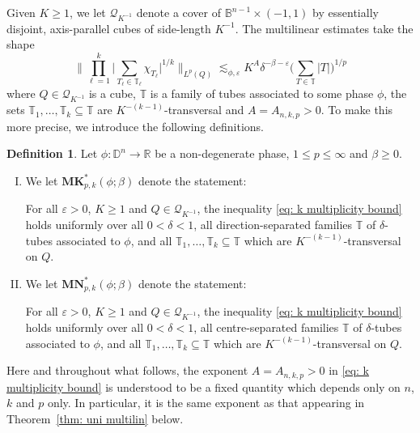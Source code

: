 \documentclass[reqno]{amsart}
\numberwithin{equation}{section}
\newcommand{\B}{\mathbb{B}}
\newcommand{\D}{\mathbb{D}}
\newcommand{\R}{\mathbb{R}}
\newcommand{\T}{\mathbb{T}}
\newcommand{\cQ}{\mathcal{Q}}
\newcommand{\bK}{\mathbf{K}}
\newcommand{\bM}{\mathbf{M}}
\theoremstyle{plain}
\theoremstyle{definition}
\newtheorem{definition}[theorem]{Definition}
\begin{document}
Given $K \geq 1$, we let $\cQ_{K^{-1}}$ denote a cover of $\B^{n-1} \times (-1,1)$ by essentially disjoint, axis-parallel cubes of side-length $K^{-1}$. The multilinear estimates take the shape
\begin{equation}\label{eq: k multiplicity bound}
     \Big\| \prod_{\ell = 1}^k \big|\sum_{T_{\ell} \in \T_{\ell}} \chi_{T_{\ell}}\big|^{1/k}\Big\|_{L^p(Q)} \lesssim_{\phi, \varepsilon} K^A \delta^{-\beta - \varepsilon} \Big(\sum_{T \in \T} |T| \Big)^{1/p}
    \end{equation}
where $Q \in \cQ_{K^{-1}}$ is a cube, $\T$ is a family of tubes associated to some phase $\phi$, the sets $\T_1,\dots, \T_k \subseteq \T$ are $K^{-(k-1)}$-transversal and $A = A_{n,k,p} > 0$. To make this more precise, we introduce the following definitions.

\begin{definition} Let $\phi \colon \D^n \to \R$ be a non-degenerate phase, $1 \leq p \leq \infty$ and $\beta \geq 0$. 
\begin{enumerate}[I)]
    \item We let $\bM\bK_{p, k}^*(\phi; \beta)$ denote the statement:\medskip
    
    \noindent For all $\varepsilon > 0$, $K \geq 1$ and $Q \in \cQ_{K^{-1}}$, the inequality
    \eqref{eq: k multiplicity bound} holds uniformly over all $0 < \delta < 1$, all direction-separated families $\T$ of $\delta$-tubes associated to $\phi$, and all $\T_1, \dots, \T_k \subseteq \T$ which are $K^{-(k-1)}$-transversal on $Q$.\medskip

    
    \item We let $\mathbf{MN}_{p, k}^*(\phi; \beta)$ denote the statement:\medskip
    
    \noindent For all $\varepsilon > 0$, $K \geq 1$ and $Q \in \cQ_{K^{-1}}$, the inequality
    \eqref{eq: k multiplicity bound}
    holds uniformly over all $0 < \delta < 1$, all centre-separated families $\T$ of $\delta$-tubes associated to $\phi$, and all $\T_1, \dots, \T_k \subseteq \T$ which are $K^{-(k-1)}$-transversal on $Q$.
\end{enumerate}
\end{definition}

Here and throughout what follows, the exponent $A = A_{n,k,p} > 0$ in \eqref{eq: k multiplicity bound} is understood to be a fixed quantity which depends only on $n$, $k$ and $p$ only. In particular, it is the same exponent as that appearing in Theorem~\ref{thm: uni multilin} below.
\end{document}

